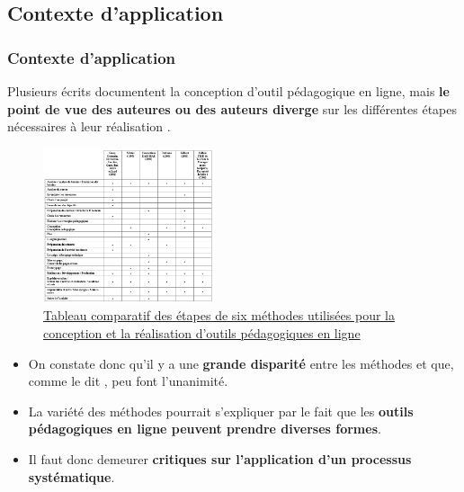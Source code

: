\begin{frame}[allowframebreaks]
\begin{itemize}
\begin{itemize}
\begin{itemize}
                                    \end{itemize} 
                                  \end{itemize}                                             
                                \end{itemize} 
                        \end{frame}

  \subsection{Contexte d'application} 
		\begin{frame}[allowframebreaks]
			\frametitle{Contexte d'application}
			Plusieurs écrits documentent la conception d’outil pédagogique en ligne, mais\textbf{ le point de vue des auteures ou des auteurs diverge} sur les différentes étapes nécessaires à leur réalisation \citep[p.18]{bonneau2013a}.
                   \begin{figure}
                     \centering
                     \includegraphics[width = 0.45\textwidth]{tableau6methodes.png}
                     \caption{\tiny{\href{run:tableau6methodes.png}{Tableau comparatif des étapes de six méthodes utilisées pour la conception et la réalisation d’outils pédagogiques en ligne \citep[p.20]{bonneau2013a}}}}
                   \end{figure}
                   \begin{itemize}                   
                   \item On constate donc qu’il y a une \textbf{grande disparité} entre les méthodes et que, comme le dit \citet{bonneau2013a}, peu font l’unanimité.
                   \item La variété des méthodes pourrait s’expliquer par le fait que les \textbf{outils pédagogiques en ligne peuvent prendre diverses formes}.
                   \item Il faut donc demeurer\textbf{ critiques sur l’application d’un processus systématique}.

\end{itemize}
\end{frame}
